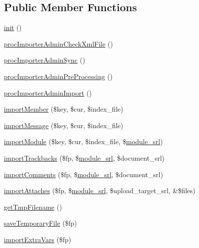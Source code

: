 \subsection*{Public Member Functions}
\begin{DoxyCompactItemize}
\item 
\hyperlink{classimporterAdminController_a5b0172b0077de7de8b718b897b9fb562}{init} ()
\item 
\hyperlink{classimporterAdminController_aa553a8db633713f858c1064a5b8fa621}{proc\+Importer\+Admin\+Check\+Xml\+File} ()
\item 
\hyperlink{classimporterAdminController_a979a756ae2a180270e08f72536c85d74}{proc\+Importer\+Admin\+Sync} ()
\item 
\hyperlink{classimporterAdminController_a112303ff9925d381a27f526b97909205}{proc\+Importer\+Admin\+Pre\+Processing} ()
\item 
\hyperlink{classimporterAdminController_a51a0e3d1bccf3f7c539b119bf394d572}{proc\+Importer\+Admin\+Import} ()
\item 
\hyperlink{classimporterAdminController_a34c3708a45075ca44f1c1e274c5e002d}{import\+Member} (\$key, \$cur, \$index\+\_\+file)
\item 
\hyperlink{classimporterAdminController_a604522c32bf020d51c1c6d868969cf7e}{import\+Message} (\$key, \$cur, \$index\+\_\+file)
\item 
\hyperlink{classimporterAdminController_a7609f3f95b4c1e10be65dfcec57d0d27}{import\+Module} (\$key, \$cur, \$index\+\_\+file, \$\hyperlink{ko_8install_8php_a370bb6450fab1da3e0ed9f484a38b761}{module\+\_\+srl})
\item 
\hyperlink{classimporterAdminController_a9f2397ca84ef0adb182cf2b63b941604}{import\+Trackbacks} (\$fp, \$\hyperlink{ko_8install_8php_a370bb6450fab1da3e0ed9f484a38b761}{module\+\_\+srl}, \$document\+\_\+srl)
\item 
\hyperlink{classimporterAdminController_a5a83e9fecd854dd75464d6f4cd63f344}{import\+Comments} (\$fp, \$\hyperlink{ko_8install_8php_a370bb6450fab1da3e0ed9f484a38b761}{module\+\_\+srl}, \$document\+\_\+srl)
\item 
\hyperlink{classimporterAdminController_a259bb7d8ae0b653dc45e544af3100753}{import\+Attaches} (\$fp, \$\hyperlink{ko_8install_8php_a370bb6450fab1da3e0ed9f484a38b761}{module\+\_\+srl}, \$upload\+\_\+target\+\_\+srl, \&\$files)
\item 
\hyperlink{classimporterAdminController_a007ae310ca94fb49d96bcdfa3688cb6d}{get\+Tmp\+Filename} ()
\item 
\hyperlink{classimporterAdminController_af263aba79294e35c2027b2e41ac2a198}{save\+Temporary\+File} (\$fp)
\item 
\hyperlink{classimporterAdminController_afa354c44da369a7d71f8d7556632705f}{import\+Extra\+Vars} (\$fp)
\end{DoxyCompactItemize}
